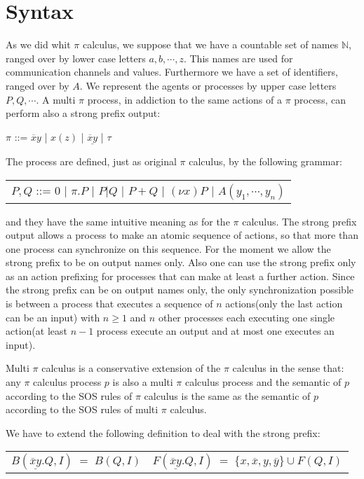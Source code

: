 
\section{Syntax}
As we did whit $\pi$ calculus, we suppose that we have a countable set of names $\mathbb{N}$, ranged over by lower case letters $a,b, \cdots, z$. This names are used for communication channels and values. Furthermore we have a set of identifiers, ranged over by $A$. We represent the agents or processes by upper case letters $P,Q, \cdots $. A multi $\pi$ process, in addiction to the same actions of a $\pi$ process, can perform also a strong prefix output:
\begin{center}
  $\pi$ ::= $\overline{x}y$ | $x(z)$ | $\underline{\overline{x}y}$ | $\tau$ 
\end{center}
The process are defined, just as original $\pi$ calculus, by the following grammar:
\begin{center}
  \begin{tabular}{l}
    $P,Q$ ::= $0$ | $\pi.P$ | $P|Q$ | $P+Q$ | $(\nu x) P$ | $A(y_{1}, \cdots, y_{n})$
  \end{tabular}
\end{center}
and they have the same intuitive meaning as for the $\pi$ calculus. The strong prefix output allows a process to make an atomic sequence of actions, so that more than one process can synchronize on this sequence. For the moment we allow the strong prefix to be on output names only. Also one can use the strong prefix only as an action prefixing for processes that can make at least a further action. Since the strong prefix can be on output names only, the only synchronization possible is between a process that executes a sequence of $n$ actions(only the last action can be an input) with $n\geq 1$ and $n$ other processes each executing one single action(at least $n-1$ process execute an output and at most one executes an input).

Multi $\pi$ calculus is a conservative extension of the $\pi$ calculus in the sense that: any $\pi$ calculus process $p$ is also a multi $\pi$ calculus process and the semantic of $p$ according to the SOS rules of $\pi$ calculus is the same as the semantic of $p$ according to the SOS rules of multi $\pi$ calculus. 

We have to extend the following definition to deal with the strong prefix:
\begin{center}
  \begin{tabular}{ll}
	$B(\underline{\overline{x}y}.Q, I)\; =\; B(Q,I)$
      &
	$F(\underline{\overline{x}y}.Q, I)\; =\; \{x,\overline{x},y,\overline{y}\}\cup F(Q, I)$
    \\
  \end{tabular}
\end{center}


